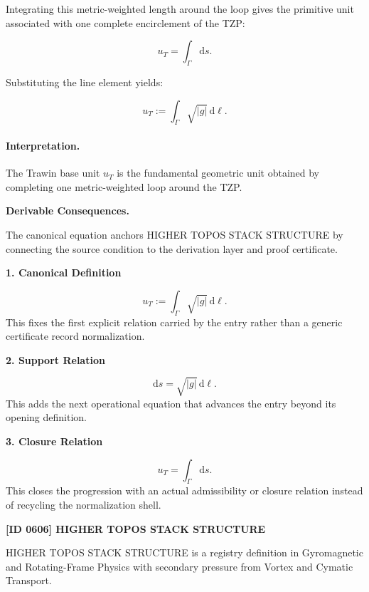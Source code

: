Integrating this metric-weighted length around the loop gives the primitive unit associated with one complete encirclement of the TZP:

\begin{equation}
u_T = \int_{\Gamma}\mathrm{d}s .
\end{equation}

Substituting the line element yields:

\begin{equation}
\boxed{
u_T := \int_{\Gamma}\sqrt{|g|}\,\mathrm{d}\ell .
}
\end{equation}

\paragraph{Interpretation.}
The Trawin base unit $u_T$ is the fundamental geometric unit obtained by completing one metric-weighted loop around the TZP.

\par\vspace{0.35em}
\noindent\textbf{Derivable Consequences.}\quad
\begingroup
\footnotesize
\raggedright
The canonical equation anchors HIGHER TOPOS STACK STRUCTURE by connecting the source condition to the derivation layer and proof certificate.
\par\endgroup

\noindent\textbf{1. Canonical Definition}\par
\[
u_T := \int_{\Gamma}\sqrt{|g|}\,\mathrm{d}\ell.
\]
\noindent This fixes the first explicit relation carried by the entry rather than a generic certificate record normalization.\par
\noindent\textbf{2. Support Relation}\par
\[
\mathrm{d}s = \sqrt{|g|}\,\mathrm{d}\ell.
\]
\noindent This adds the next operational equation that advances the entry beyond its opening definition.\par
\noindent\textbf{3. Closure Relation}\par
\[
u_T = \int_{\Gamma}\mathrm{d}s.
\]
\noindent This closes the progression with an actual admissibility or closure relation instead of recycling the normalization shell.\par

\clearpage
\noindent\textbf{[ID 0606] HIGHER TOPOS STACK STRUCTURE}\par
\vspace{0.35em}
\begingroup\small
{}
HIGHER TOPOS STACK STRUCTURE is a registry definition in Gyromagnetic and Rotating-Frame Physics with secondary pressure from Vortex and Cymatic Transport.

